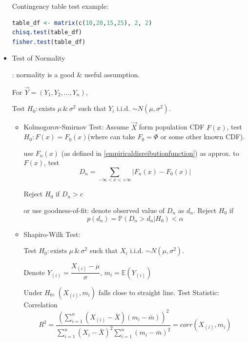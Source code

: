 \begin{itemize}
\begin{rcode}
    Contingency table test example:
\begin{lstlisting}[language=R]
table_df <- matrix(c(10,20,15,25), 2, 2)
chisq.test(table_df)
fisher.test(table_df)
\end{lstlisting}
\end{rcode}

    \item \hypertarget{testofnormality}{Test of Normality}: normality is a good \& useful assumption.
    
    For $\vec{Y}=(Y_1,Y_2,\ldots,Y_n)$,

    Test $H_0:\text{exists }\mu\,\&\, \sigma^2$ such that $Y_i$ i.i.d. $\sim N(\mu,\sigma^2)$.

    \begin{itemize}
        \item Kolmogorov-Smirnov Test: Assume $\vec{X}$ form population CDF $F(x)$, test $H_0:F(x)=F_0(x)$(where can take $F_0=\Phi$ or some other known CDF).
        
        use $F_n(x)$ (as defined in \autoref{empiricaldisreibutionfunction}) as approx. to $F(x)$, test
        \begin{equation}
            D_n=\sum_{-\infty< x<+\infty}|F_n(x)-F_0(x)|
        \end{equation}

        Reject $H_0$ if $D_n>c$

        or use goodness-of-fit: denote observed value of $D_n$ as $d_n$. Reject $H_0$ if
        \begin{equation}
            p(d_n)=\mathbb{P}(D_n>d_n|H_0)<\alpha
        \end{equation}

        \item Shapiro-Wilk Test:
        
        Test $H_0:\text{exists }\mu\,\&\, \sigma^2$ such that $X_i$ i.i.d. $\sim N(\mu,\sigma^2)$.

        Denote $Y_{(i)}=\dfrac{X_{(i)}-\mu}{\sigma}$, $m_i=\mathbb{E}(Y_{(i)})$

        Under $H_0$, $(X_{(i)},m_i)$ falls close to straight line. Test Statistic: Correlation
        \begin{equation}
            R^2=\dfrac{\left(\sum_{i=1}^n(X_{(i)}-\bar{X})(m_i-\bar{m})\right)^2}{\sum_{i=1}^n(X_{i}-\bar{X})^2\sum_{i=1}^n(m_i-\bar{m})^2}=corr(X_{(i)},m_i)
        \end{equation}


\end{itemize}
\end{itemize}
